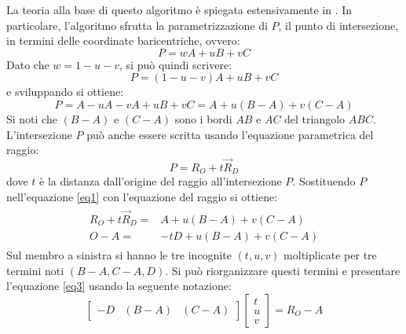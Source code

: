 La teoria alla base di questo algoritmo è spiegata estensivamente in \cite{Moller}. In particolare, l'algoritmo sfrutta la parametrizzazione di $P$, il punto di intersezione, in termini delle coordinate baricentriche, ovvero:
\begin{equation}
	P = wA + uB + vC
\end{equation}
Dato che $w = 1-u-v$, si può quindi scrivere:
\begin{equation}
	P = (1-u-v)A + uB + vC
\end{equation}
e sviluppando si ottiene:
\begin{equation}
	P = A-uA-vA+uB+vC = A+u(B-A)+v(C-A)
	\label{eq1}
\end{equation}
Si noti che $(B-A)$ e $(C-A)$ sono i bordi $AB$ e $AC$ del triangolo $ABC$. L'intersezione $P$ può anche essere scritta usando l'equazione parametrica del raggio:
\begin{equation}
	P = R_O + t\vec{R}_D
	\label{eq2}
\end{equation}
dove $t$ è la distanza dall'origine del raggio all'intersezione $P$. Sostituendo $P$ nell'equazione \ref{eq1} con l'equazione del raggio si ottiene:
\begin{equation}
	\begin{split}
	\begin{aligned}
		R_O + t\vec{R}_D =& A+u(B-A)+v(C-A)\\
		O - A =& -tD+u(B-A)+v(C-A)
	\end{aligned}
	\end{split}
	\label{eq3}
\end{equation}
Sul membro a sinistra si hanno le tre incognite $(t,u,v)$ moltiplicate per tre termini noti $(B-A, C-A, D)$. Si può riorganizzare questi termini e presentare l'equazione \ref{eq3} usando la seguente notazione:
\begin{equation}
	\begin{bmatrix}
	-D & (B-A) & (C-A)
	\end{bmatrix}
	\begin{bmatrix}
	t \\
	u \\
	v
	\end{bmatrix} = R_O - A
	\label{eq4}
\end{equation}
